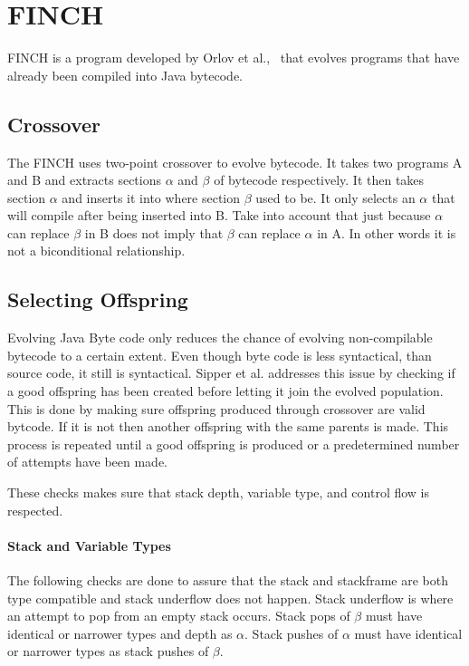 \documentclass{sig-alternate}
\begin{document}
\section{FINCH}
FINCH is a program developed by Orlov et al.,~\cite{FINCH2:2009,FINCH:2011} that evolves programs that have already been compiled into Java bytecode.

\subsection{Crossover}

The FINCH uses two-point crossover to evolve bytecode. It takes two programs A and B and extracts sections $\alpha$ and $\beta$ of bytecode respectively. It then takes section $\alpha$ and inserts it into where section $\beta$ used to be. It only selects an $\alpha$ that will compile after being inserted into B. Take into account that just because $\alpha$ can replace $\beta$ in B does not imply that $\beta$ can replace $\alpha$ in A. In other words it is not a biconditional relationship.

\subsection{Selecting Offspring}
Evolving Java Byte code only reduces the chance of evolving non-compilable bytecode to a certain extent. Even though byte code is less syntactical, than source code, it still is syntactical. Sipper et al.\cite{FINCH2:2009} addresses this issue by checking if a good offspring has been created before letting it join the evolved population. This is done by making sure offspring produced through crossover are valid bytcode. If it is not then another offspring with the same parents is made. This process is repeated until a good offspring is produced or a predetermined number of attempts have been made.\par
These checks makes sure that stack depth, variable type, and control flow is respected.

\paragraph{Stack and Variable Types}
The following checks are done to assure that the stack and stackframe are both type compatible and stack underflow does not happen. Stack underflow is where an attempt to pop from an empty stack occurs. Stack pops of $\beta$ must have identical or narrower types and depth as $\alpha$. Stack pushes of $\alpha$ must have identical or narrower types as stack pushes of $\beta$.
\end{document}
